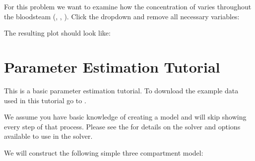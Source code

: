 \documentclass[letterpaper,10pt,english]{sphinxmanual}
\begin{document}
\begin{figure}[htbp]
\centering

\noindent{}
\end{figure}

\sphinxAtStartPar
For this problem we want to examine how the concentration of  varies
throughout the bloodsteam (, , ). Click the 
dropdown and remove all necessary variables:

\begin{figure}[htbp]
\centering

\noindent{}
\end{figure}

\sphinxAtStartPar
The resulting plot should look like:

\begin{figure}[htbp]
\centering

\noindent{}
\end{figure}


\chapter{Parameter Estimation Tutorial}
\label{\detokenize{pages/tutorial_par_estimation:parameter-estimation-tutorial}}\label{\detokenize{pages/tutorial_par_estimation::doc}}
\sphinxAtStartPar
This is a basic parameter estimation tutorial. To download the example data
used in this tutorial go to
.

\sphinxAtStartPar
We assume you have basic knowledge of creating a model and will skip showing
every step of that process. Please see the
{\hyperref[\detokenize{pages/backend/parameter_estimation::doc}]{}}
for details on the solver and options available to use in the solver.

\sphinxAtStartPar
We will construct the following simple three compartment model:

\begin{figure}[htbp]
\centering

\noindent{}
\end{figure}
\end{document}
